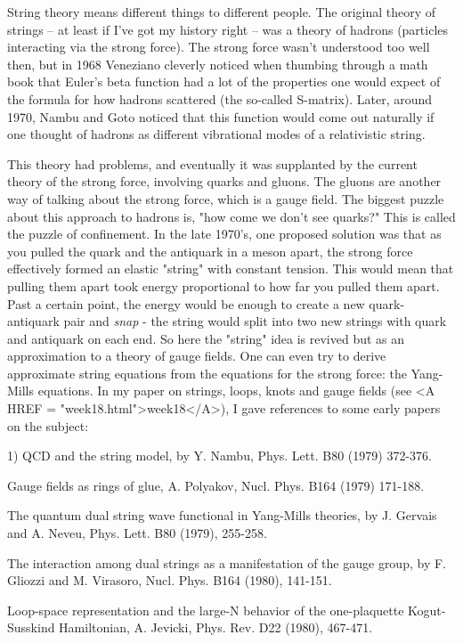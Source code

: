 

String theory means different things to different people.  The original
theory of strings -- at least if I've got my history right -- was a
theory of hadrons (particles interacting via the strong force).  The
strong force wasn't understood too well then, but in 1968 Veneziano cleverly
noticed when thumbing through a math book that Euler's beta function 
had a lot of the properties one would expect of the formula for how
hadrons scattered (the so-called S-matrix).  Later, around 1970, Nambu
and Goto noticed that this function would come out naturally if one
thought of hadrons as different vibrational modes of a relativistic
string.  

This theory had problems, and eventually it was supplanted by the
current theory of the strong force, involving quarks and gluons.  The
gluons are another way of talking about the strong force, which is a
gauge field.  The biggest puzzle about this approach to hadrons is, "how
come we don't see quarks?"  This is called the puzzle of confinement.
In the late 1970's, one proposed solution was that as you pulled the
quark and the antiquark in a meson apart, the strong force effectively
formed an elastic "string" with constant tension.  This would mean that
pulling them apart took energy proportional to how far you pulled them
apart.  Past a certain point, the energy would be enough to create a new
quark-antiquark pair and \emph{snap} - the string would split into two new
strings with quark and antiquark on each end.  So here the "string" idea
is revived but as an approximation to a theory of gauge fields.  One can
even try to derive approximate string equations from the equations for
the strong force: the Yang-Mills equations.  In my paper on strings,
loops, knots and gauge fields (see <A HREF = "week18.html">week18</A>), I gave references to some
early papers on the subject:

1) QCD and the string model, by Y. Nambu, Phys. Lett. B80 (1979) 372-376.  

Gauge fields as rings of glue, A. Polyakov, Nucl. Phys. B164 (1979)
171-188.

The quantum dual string wave functional in Yang-Mills theories, by
J. Gervais and A. Neveu, Phys. Lett. B80 (1979), 255-258.

The interaction among dual strings as a manifestation of the gauge
group, by F. Gliozzi and M. Virasoro, Nucl. Phys. B164 (1980), 141-151. 

Loop-space representation and the large-N behavior of the one-plaquette
Kogut-Susskind Hamiltonian, A. Jevicki, Phys. Rev. D22 (1980), 467-471. 

